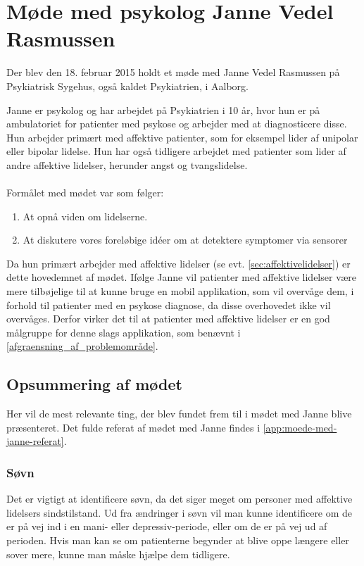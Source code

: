 \section{Møde med psykolog Janne Vedel Rasmussen}\label{sec:moede-med-psykolog}
Der blev den 18. februar 2015 holdt et møde med Janne Vedel Rasmussen på Psykiatrisk Sygehus, også kaldet Psykiatrien, i Aalborg.

Janne er psykolog og har arbejdet på Psykiatrien i 10 år, hvor hun er på ambulatoriet for patienter med psykose og arbejder med at diagnosticere disse. 
Hun arbejder primært med affektive patienter, som for eksempel lider af unipolar eller bipolar lidelse.
Hun har også tidligere arbejdet med patienter som lider af andre affektive lidelser, herunder angst og tvangslidelse.

\paragraph{}
Formålet med mødet var som følger:

\begin{enumerate}
\item At opnå viden om lidelserne.
\item At diskutere vores foreløbige idéer om at detektere symptomer via sensorer
\end{enumerate}

Da hun primært arbejder med affektive lidelser (se evt. \cref{sec:affektivelidelser}) er dette hovedemnet af mødet.
Ifølge Janne vil patienter med affektive lidelser være mere tilbøjelige til at kunne bruge en mobil applikation, som vil overvåge dem, i forhold til patienter med en psykose diagnose, da disse overhovedet ikke vil overvåges.
Derfor virker det til at patienter med affektive lidelser er en god målgruppe for denne slags applikation, som benævnt i \cref{afgraensning_af_problemområde}.

\subsection{Opsummering af mødet}
Her vil de mest relevante ting, der blev fundet frem til i mødet med Janne blive præsenteret.
Det fulde referat af mødet med Janne findes i \cref{app:moede-med-janne-referat}.

\subsubsection{Søvn}
Det er vigtigt at identificere søvn, da det siger meget om personer med affektive lidelsers sindstilstand.
Ud fra ændringer i søvn vil man kunne identificere om de er på vej ind i en mani- eller depressiv-periode, eller om de er på vej ud af perioden. 
Hvis man kan se om patienterne begynder at blive oppe længere eller sover mere, kunne man måske hjælpe dem tidligere.


